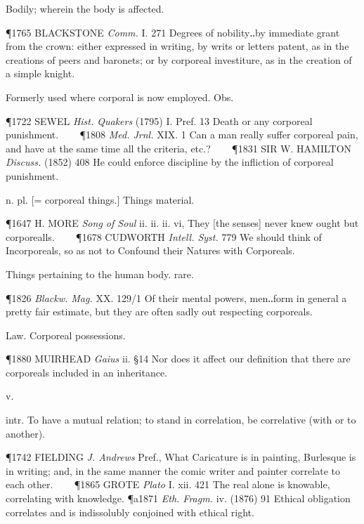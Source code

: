 \begin{description}[wide, labelwidth=!, labelindent=0pt]
\begin{myenumerate}
 Bodily; wherein the body is affected.

\P 1765 BLACKSTONE  \textit{Comm.} I. 271 Degrees of nobility‥by immediate grant from the crown: either expressed in writing, by writs or letters patent, as in the creations of peers and baronets; or by corporeal investiture, as in the creation of a simple knight.

 Formerly used where corporal is now employed. Obs.

\P 1722 SEWEL  \textit{Hist. Quakers} (1795) I. Pref. 13 Death or any corporeal punishment.    
\P 1808  \textit{Med. Jrnl.} XIX. 1 Can a man really suffer corporeal pain, and have at the same time all the criteria, etc.?    
\P 1831 SIR W. HAMILTON  \textit{Discuss.} (1852) 408 He could enforce discipline by the infliction of corporeal punishment.

 n. pl. [= corporeal things.] Things material.

\P 1647 H. MORE  \textit{Song of Soul} ii. ii. ii. vi, They [the senses] never knew ought but corporealls.    
\P 1678 CUDWORTH  \textit{Intell. Syst.} 779 We should think of Incorporeals, so as not to Confound their Natures with Corporeals.

 Things pertaining to the human body. rare.

\P 1826  \textit{Blackw. Mag.} XX. 129/1 Of their mental powers, men‥form in general a pretty fair estimate, but they are often sadly out respecting corporeals.

 Law. Corporeal possessions.

\P 1880 MUIRHEAD  \textit{Gaius} ii. §14 Nor does it affect our definition that there are corporeals included in an inheritance.
\end{myenumerate}


 v.

\noindent {}

\vspace{-0.3cm}

\begin{myenumerate}

 intr. To have a mutual relation; to stand in correlation, be correlative (with or to another).

\P 1742 FIELDING  \textit{J. Andrews} Pref., What Caricature is in painting, Burlesque is in writing; and, in the same manner the comic writer and painter correlate to each other.    
\P 1865 GROTE  \textit{Plato} I. xii. 421 The real alone is knowable, correlating with knowledge.
\P a1871 \textit{Eth. Fragm.} iv. (1876) 91 Ethical obligation correlates and is indissolubly conjoined with ethical right.


\end{myenumerate}
\end{description}
